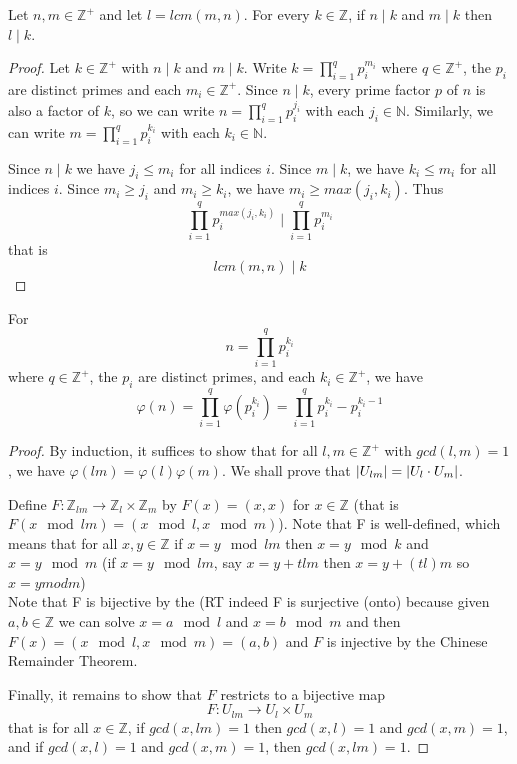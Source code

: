 \begin{lem}
Let $n,m\in\mathbb{Z}^+$ and let $l = lcm(m,n)$. For every $k\in\mathbb{Z}$, if $n\mid k$ and $m\mid k$ then $l\mid k$.
\end{lem}

\begin{proof}
Let $k\in\mathbb{Z}^+$ with $n\mid k$ and $m\mid k$. Write $k = \prod_{i = 1}^{q} p_i^{m_i}$ where $q\in\mathbb{Z}^+$, the $p_i$ are distinct primes and each $m_i\in\mathbb{Z}^+$. Since $n\mid k$, every prime factor $p$ of $n$ is also a factor of $k$, so we can write $n = \prod_{i = 1}^{q} p_i^{j_i}$ with each $j_i \in\mathbb{N}$. Similarly, we can write $m = \prod_{i = 1}^{q} p_i^{k_i}$ with each $k_i\in\mathbb{N}$. 

Since $n\mid k$ we have $j_i\leq m_i$ for all indices $i$. Since $m\mid k$, we have $k_i\leq m_i$ for all indices $i$. Since $m_i\geq j_i$ and $m_i\geq k_i$, we have $m_i\geq max(j_i,k_i)$. Thus \[\prod_{i = 1}^{q} p_i^{max(j_i,k_i)} \mid \prod_{i = 1}^{q} p_i^{m_i}\] that is \[lcm(m,n) \mid k\]
\end{proof}

\begin{thm}
For \[n = \prod_{i=1}^q p_i^{k_i}\] where $q\in\mathbb{Z}^+$, the $p_i$ are distinct primes, and each $k_i\in\mathbb{Z}^+$, we have 
\[\varphi (n) = \prod_{i=1}^q \varphi(p_i^{k_i}) = \prod_{i=1}^q p_i^{k_i} -p_i^{k_i-1}\]
\end{thm}

\begin{proof}
By induction, it suffices to show that for all $l,m\in\mathbb{Z}^+$ with $gcd(l,m) = 1$, we have $\varphi (lm) = \varphi(l) \varphi(m)$. We shall prove that $\left| U_{lm} \right| = \left| U_l \cdot U_m \right|$.

Define $F\colon \mathbb{Z}_{lm}\to \mathbb{Z}_l \times \mathbb{Z}_m$  by $F(x) = (x,x)$ for $x\in\mathbb{Z}$ (that is $F(x\mod lm) = (x\mod l, x\mod m)$).
Note that F is well-defined, which means that for all $x,y \in \mathbb{Z}$ if $x= y \mod lm$ then $x = y \mod k$ and $x=y \mod m$ (if $x= y\mod lm$, say $x=y +tlm$ then $ x = y+(tl)m$ so $ x = y mod m$)\\
Note that F is bijective by the (RT indeed F is surjective (onto) because given $a,b\in\mathbb{Z}$ we can solve $x=a\mod l$ and $x = b\mod m$ and then $F(x) = (x\mod l,x\mod m) = (a,b)$ and $F$ is injective by the Chinese Remainder Theorem.

Finally, it remains to show that $F$ restricts to a bijective map \[F\colon U_{lm} \to U_l \times U_m\] that is for all $x\in \mathbb{Z}$, if $gcd(x,lm) = 1$ then $gcd(x,l) = 1$ and $gcd(x,m) = 1$, and if $gcd(x,l) = 1$ and $gcd(x,m) = 1$, then $gcd(x,lm) = 1$.
\end{proof}